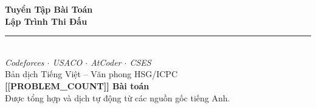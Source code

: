 \documentclass[12pt,a4paper]{article}
\begin{document}
\hypersetup{pageanchor=false}

\begin{titlepage}
  \centering
  \vspace*{3cm}
  {\Huge\bfseries\color{sectioncolor} Tuyển Tập Bài Toán\\[0.4em]
   Lập Trình Thi Đấu}\\[1.5em]
  \rule{0.6\linewidth}{2pt}\\[1em]
  {\large\itshape Codeforces $\cdot$ USACO $\cdot$ AtCoder $\cdot$ CSES}\\[1em]
  {\normalsize Bản dịch Tiếng Việt -- Văn phong HSG/ICPC}\\[3cm]
  {\large \textbf{[[PROBLEM_COUNT]] Bài toán}}\\[0.5em]
  \vfill
  {\small Được tổng hợp và dịch tự động từ các nguồn gốc tiếng Anh.}
\end{titlepage}
\clearpage
\hypersetup{pageanchor=true}

\tableofcontents
\newpage

\end{document}
